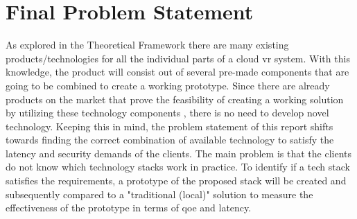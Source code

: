 \section{Final Problem Statement}

As explored in the Theoretical Framework there are many existing products/technologies for all the individual parts of a cloud \acrshort{vr} system. With this knowledge, the product will consist out of several pre-made components that are going to be combined to create a working prototype. Since there are already products on the market that prove the feasibility of creating a working solution by utilizing these technology components \parencite{zerolight5g}, there is no need to develop novel technology. Keeping this in mind, the problem statement of this report shifts towards finding the correct combination of available technology to satisfy the latency and security demands of the clients. The main problem is that the clients do not know which technology stacks work in practice. To identify if a tech stack satisfies the requirements, a prototype of the proposed stack will be created and subsequently compared to a "traditional (local)" solution to measure the effectiveness of the prototype in terms of \acrshort{qoe} and latency.